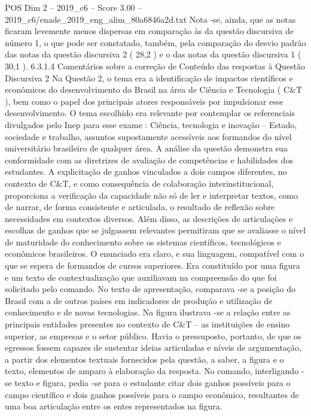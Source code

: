 \begin{textsample}{POS Dim 2 – 2019\_c6 – Score 3.00 – 2019\_c6/enade\_2019\_eng\_alim\_80a6846a2d.txt}
Nota -se, ainda, que as notas ficaram levemente menos dispersas em comparação às da questão discursiva de número 1, o que pode ser constatado, também, pela comparação do desvio padrão das notas da questão discursiva 2 ( 28,2 ) e o das notas da questão discursiva 1 ( 30,1 ). 6.3.1.4 Comentários sobre a correção de Conteúdo das respostas à Questão Discursiva 2 Na Questão 2, o tema era a identificação de impactos científicos e econômicos do desenvolvimento do Brasil na área de Ciência e Tecnologia ( C\&T ), bem como o papel dos principais atores responsáveis por impulsionar esse desenvolvimento.
O tema escolhido era relevante por contemplar os referenciais divulgados pelo Inep para esse exame : Ciência, tecnologia e inovação – Estado, sociedade e trabalho, assuntos supostamente acessíveis aos formandos do nível universitário brasileiro de qualquer área.
A análise da questão demonstra sua conformidade com as diretrizes de avaliação de competências e habilidades dos estudantes.
A explicitação de ganhos vinculados a dois campos diferentes, no contexto de C\&T, e como consequência de colaboração interinstitucional, proporciona a verificação da capacidade não só de ler e interpretar textos, como de narrar, de forma consistente e articulada, o resultado de reflexão sobre necessidades em contextos diversos.
Além disso, as descrições de articulações e escolhas de ganhos que se julgassem relevantes permitiram que se avaliasse o nível de maturidade do conhecimento sobre os sistemas científicos, tecnológicos e econômicos brasileiros.
O enunciado era claro, e sua linguagem, compatível com o que se espera de formandos de cursos superiores.
Era constituído por uma figura e um texto de contextualização que auxiliavam na compreensão do que foi solicitado pelo comando.
No texto de apresentação, comparava -se a posição do Brasil com a de outros países em indicadores de produção e utilização de conhecimento e de novas tecnologias.
Na figura ilustrava -se a relação entre as principais entidades presentes no contexto de C\&T – as instituições de ensino superior, as empresas e o setor público.
Havia o pressuposto, portanto, de que os egressos fossem capazes de sustentar ideias articuladas e níveis de argumentação, a partir dos elementos textuais fornecidos pela questão, a saber, a figura e o texto, elementos de amparo à elaboração da resposta.
No comando, interligando -se texto e figura, pedia -se para o estudante citar dois ganhos possíveis para o campo científico e dois ganhos possíveis para o campo econômico, resultantes de uma boa articulação entre os entes representados na figura.

\end{textsample}
